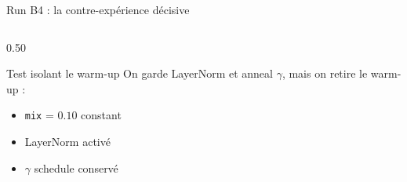 \documentclass[10pt]{beamer}
\begin{document}
\begin{frame}{Run B4 : la contre-expérience décisive}
  \begin{columns}
    \begin{column}{0.50\textwidth}
      \begin{block}{Test isolant le warm-up}
        \footnotesize
        On garde LayerNorm et anneal $\gamma$, mais on \alert{retire le warm-up} :
        \begin{itemize}
          \item \texttt{mix} = $0.10$ constant
          \item LayerNorm activé
          \item $\gamma$ schedule conservé
        \end{itemize}
      \end{block}


\end{column}
\end{columns}
\end{frame}
\end{document}
